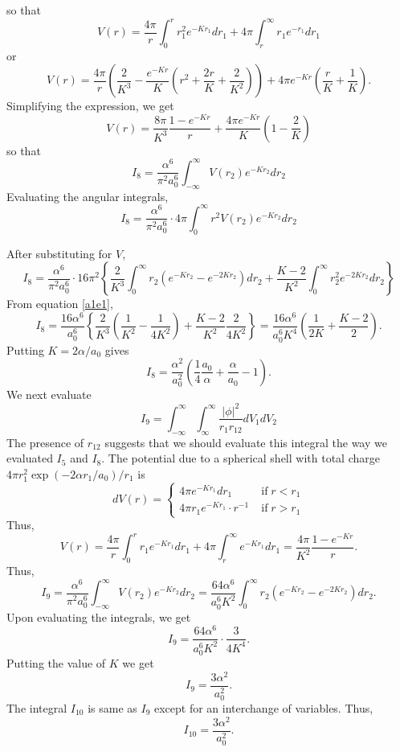 \documentclass{article}
\numberwithin{equation}{section}
\begin{document}
so that
\[
V(r) = \frac{4\pi}{r}\int_0^r r_1^2e^{-Kr_1}dr_1 + 
       4\pi\int_r^\infty r_1 e^{-r_1}dr_1
\]
or
\[
V(r) = \frac{4\pi}{r}\left(\frac{2}{K^3} - \frac{e^{-Kr}}{K}\left(r^2 +
\frac{2r}{K} + \frac{2}{K^2}\right)\right) + 4\pi e^{-Kr}\left(\frac{r}
{K} + \frac{1}{K}\right).
\]
Simplifying the expression, we get
\[
V(r) = \frac{8\pi}{K^3}\frac{1 - e^{-Kr}}{r} + \frac{4\pi e^{-Kr}}{K}
\left(1 - \frac{2}{K}\right)
\]
so that
\[
I_8 = \frac{\alpha^6}{\pi^2 a_0^6}\int_{-\infty}^\infty V(r_2)e^{-Kr_2}dr_2
\]
Evaluating the angular integrals,
\[
I_8 = \frac{\alpha^6}{\pi^2 a_0^6}\cdot 4\pi \int_0^\infty r^2
V(r_2)e^{-Kr_2}dr_2
\]

After substituting for $V$,
\[
I_8 = \frac{\alpha^6}{\pi^2 a_0^6} \cdot 16\pi^2 \left\{
\frac{2}{K^3}\int_0^\infty r_2(e^{-Kr_2} - e^{-2Kr_2})dr_2 + 
\frac{K-2}{K^2}\int_0^\infty r_2^2 e^{-2Kr_2}dr_2\right\}
\]
From equation \eqref{a1e1},
\[
I_8 = \frac{16\alpha^6}{a_0^6}\left\{\frac{2}{K^3}\left(\frac{1}{K^2} -
    \frac{1}{4K^2}\right) + \frac{K-2}{K^2}\frac{2}{4K^2}\right\}
 = \frac{16\alpha^6}{a_0^6K^4}\left(\frac{1}{2K} + \frac{K-2}{2}\right).
\]
Putting $K = 2\alpha/a_0$ gives
\begin{equation}\label{s5e82}
I_8 = \frac{\alpha^2}{a_0^2}\left(\frac{1}{4}\frac{a_0}{\alpha} + 
      \frac{\alpha}{a_0} - 1\right).
\end{equation}
We next evaluate
\[
I_9 = \int_{-\infty}^\infty\int_{\infty}^\infty \frac{|\phi|^2}{r_1r_{12}}
dV_1dV_2
\]
The presence of $r_{12}$ suggests that we should evaluate this integral 
the way we evaluated $I_5$ and $I_8$. The potential due to a spherical
shell with total charge $4\pi r_1^2\exp(-2\alpha r_1/a_0)/r_1$ is
\[
dV(r) = \begin{cases}
4\pi e^{-Kr_1}dr_1 & \;\text{if}\; r < r_1 \\
4\pi r_1 e^{-Kr_1}\cdot r^{-1} & \;\text{if}\; r > r_1
\end{cases}
\]
Thus,
\[
V(r) = \frac{4\pi}{r}\int_0^r r_1e^{-Kr_1}dr_1 + 
4\pi\int_r^\infty e^{-Kr_1}dr_1 = \frac{4\pi}{K^2}\frac{1 - e^{-Kr}}{r}.
\]
Thus,
\[
I_9 = \frac{\alpha^6}{\pi^2 a_0^6}
\int_{-\infty}^\infty V(r_2)e^{-Kr_2}dr_2 = \frac{64\alpha^6}{a_0^6K^2}
\int_0^\infty r_2(e^{-Kr_2} - e^{-2Kr_2})dr_2.
\]
Upon evaluating the integrals, we get
\[
I_9 = \frac{64\alpha^6}{a_0^6K^2}\cdot\frac{3}{4K^4}.
\]
Putting the value of $K$ we get
\begin{equation}\label{s5e83}
I_9 = \frac{3\alpha^2}{a_0^2}.
\end{equation}
The integral $I_{10}$ is same as $I_9$ except for an interchange of
variables. Thus,
\begin{equation}\label{s5e84}
I_{10} = \frac{3\alpha^2}{a_0^2}.
\end{equation}
\end{document}
